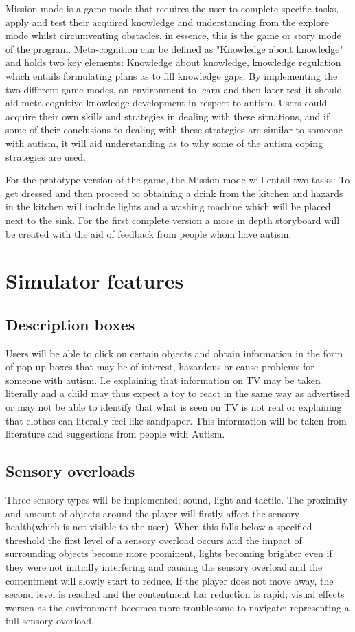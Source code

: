 \documentclass[11pt]{report}
\begin{document}
Mission mode is a game mode that requires the user to complete specific tasks, apply and test their acquired knowledge and understanding from the explore mode whilst circumventing obstacles, in essence, this is the game or story mode of the program. Meta-cognition can be defined as "Knowledge about knowledge" and holds two key elements: Knowledge about knowledge, knowledge regulation which entails formulating plans as to fill knowledge gaps. By implementing the two different game-modes, an environment to learn and then later test it should aid meta-cognitive knowledge development in respect to autism. Users could acquire their own skills and strategies in dealing with these situations, and if some of their conclusions to dealing with these strategies are similar to someone with autism, it will aid understanding as to why some of the autism coping strategies are used.  

For the prototype version of the game, the Mission mode will entail two tasks: To get dressed and then proceed to obtaining a drink from the kitchen and hazards in the kitchen will include lights and a washing machine which will be placed next to the sink. For the first complete version a more in depth storyboard will be created with the aid of feedback from people whom have autism. 

\section{Simulator features}

\subsection{Description boxes}
Users will be able to click on certain objects and obtain information in the form of pop up boxes that may be of interest, hazardous or cause problems for someone with autism. I.e explaining that information on TV may be taken literally and a child may thus expect a toy to react in the same way as advertised or may not be able to identify that what is seen on TV is not real or explaining that clothes can literally feel like sandpaper. This information will be taken from literature and suggestions from people with Autism. 

\subsection{Sensory overloads}
Three sensory-types will be implemented; sound, light and tactile. The proximity and amount of objects around the player will firstly affect the sensory health(which is not visible to the user). When this falls below a specified threshold the first level of a sensory overload occurs and the impact of surrounding objects become more prominent, lights becoming brighter even if they were not initially interfering and causing the sensory overload and the contentment will slowly start to reduce. If the player does not move away, the second level is reached and the contentment bar reduction is rapid; visual effects worsen as the environment becomes more troublesome to navigate; representing a full sensory overload.
\end{document}
